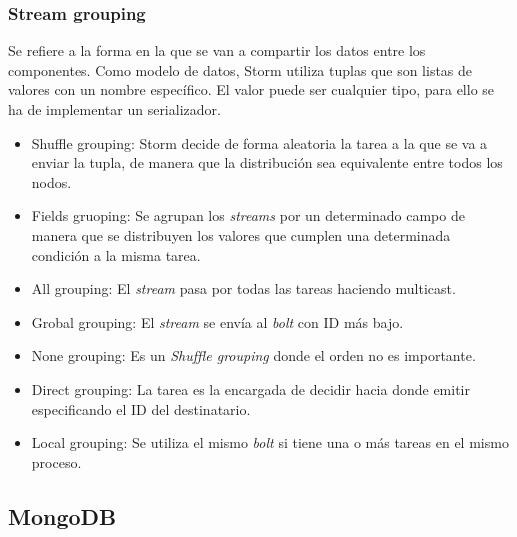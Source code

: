 	\subsubsection{Stream grouping}

	Se refiere a la forma en la que se van a compartir los datos entre los componentes. Como modelo de datos, Storm utiliza tuplas que son listas de valores con un nombre específico. El valor puede ser cualquier tipo, para ello se ha de implementar un serializador.\\

	\begin{itemize}
	\item Shuffle grouping: Storm decide de forma aleatoria la tarea a la que se va a enviar la tupla, de manera que la distribución sea equivalente entre todos los nodos.
	\item Fields gruoping: Se agrupan los \textit{streams} por un determinado campo de manera que se distribuyen los valores que cumplen una determinada condición a la misma tarea.
	\item All grouping: El \textit{stream} pasa por todas las tareas haciendo multicast.
	\item Grobal grouping: El \textit{stream} se envía al \textit{bolt} con ID más bajo.
	\item None grouping: Es un \textit{Shuffle grouping} donde el orden no es importante.
	\item Direct grouping: La tarea es la encargada de decidir hacia donde emitir especificando el ID del destinatario.
	\item Local grouping: Se utiliza el mismo \textit{bolt} si tiene una o más tareas en el mismo proceso.
	\end{itemize}

	\subsection{MongoDB}
	